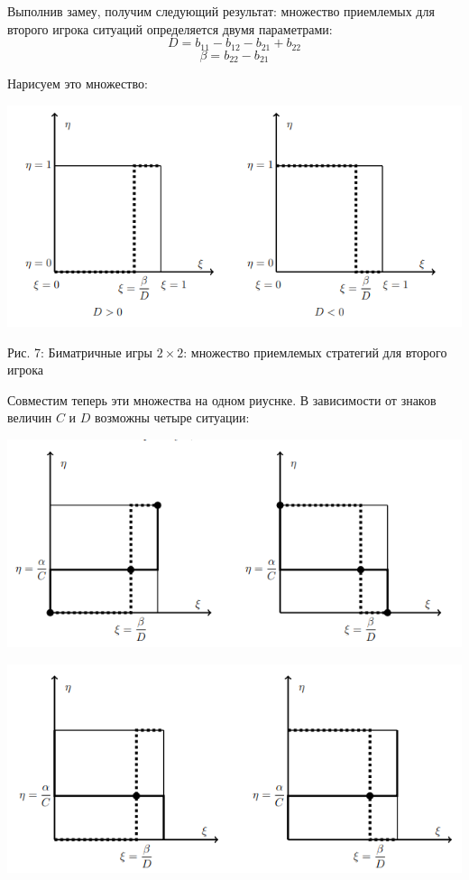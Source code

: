 \documentclass[aps,%
12pt,%
final,%
oneside,
onecolumn,%
musixtex, %
superscriptaddress,%
centertags]{article} %
\theoremstyle{plain}
\theoremstyle{definition}
\theoremstyle{remark}
\begin{document}
Выполнив замеу, получим следующий результат: множество приемлемых для второго игрока ситуаций определяется двумя параметрами:
$$D = b_{11}-b_{12}-b_{21}+b_{22}$$
$$\beta = b_{22}-b_{21}$$

Нарисуем это множество:
\begin{center}
  \includegraphics[scale=0.6]{images/7.png}

  Рис. 7: Биматричные игры $2\times2$: множество приемлемых стратегий для второго игрока
\end{center}

Совместим теперь эти множества на одном риуснке. В зависимости от знаков величин $C$ и $D$ возможны четыре ситуации:
\begin{center}
  \includegraphics[scale=0.6]{images/8.png}

  \includegraphics[scale=0.6]{images/9.png}
\end{center}
\end{document}
